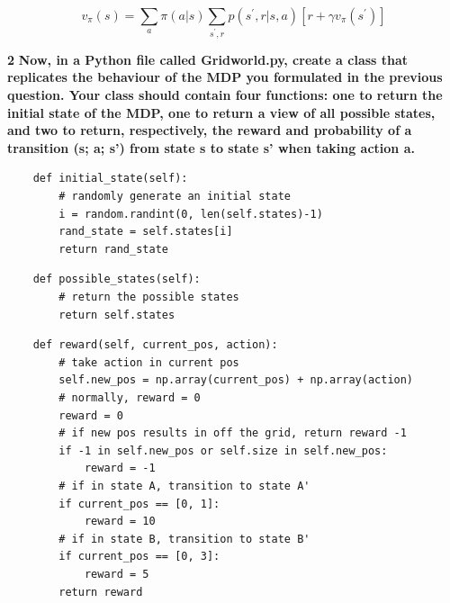 \documentclass[11pt]{article}
\begin{document}
\begin{equation}
v_{\pi}(s)=\sum_{a} \pi(a | s) \sum_{s^{\prime}, r} p\left(s^{\prime}, r | s, a\right)\left[r+\gamma v_{\pi}\left(s^{\prime}\right)\right]
\end{equation}


\newpage
\noindent
\textbf{2}
\noindent
\textbf{Now, in a Python file called Gridworld.py, create a class that replicates
the behaviour of the MDP you formulated in the previous question. Your class
should contain four functions: one to return the initial state of the MDP, one to
return a view of all possible states, and two to return, respectively, the reward and
probability of a transition (s; a; s') from state s to state s' when taking action a.}
\\

\lstset{language=Python}
\lstset{frame=lines}
\lstset{basicstyle=\footnotesize}
\begin{lstlisting}
    def initial_state(self):
        # randomly generate an initial state
        i = random.randint(0, len(self.states)-1)
        rand_state = self.states[i]
        return rand_state
\end{lstlisting}

\lstset{basicstyle=\footnotesize}
\begin{lstlisting}
    def possible_states(self):
        # return the possible states
        return self.states
\end{lstlisting}

\lstset{basicstyle=\footnotesize}
\begin{lstlisting}
    def reward(self, current_pos, action):
        # take action in current pos
        self.new_pos = np.array(current_pos) + np.array(action)
        # normally, reward = 0
        reward = 0
        # if new pos results in off the grid, return reward -1
        if -1 in self.new_pos or self.size in self.new_pos:
            reward = -1
        # if in state A, transition to state A'
        if current_pos == [0, 1]:
            reward = 10
        # if in state B, transition to state B'
        if current_pos == [0, 3]:
            reward = 5
        return reward
\end{lstlisting}


\end{document}
